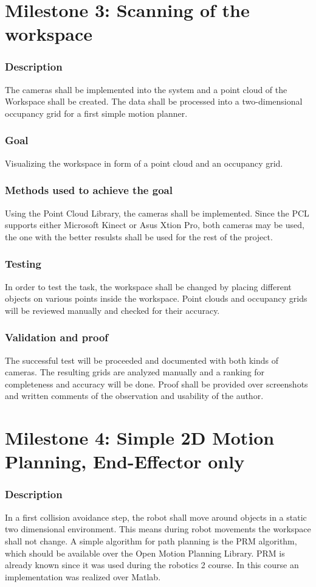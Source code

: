 \section{Milestone 3: Scanning of the workspace}
\label{chap:mile3}
\subsubsection{Description}
The cameras shall be implemented into the system and a point cloud of the Workspace shall be created. The data shall be processed into a two-dimensional occupancy grid for a first simple motion planner.
\subsubsection{Goal}
Visualizing the workspace in form of a point cloud and an occupancy grid.
\subsubsection{Methods used to achieve the goal}
Using the Point Cloud Library, the cameras shall be implemented. Since the PCL supports either Microsoft Kinect or Asus Xtion Pro, both cameras may be used, the one with the better resulsts shall be used for the rest of the project.
\subsubsection{Testing}
In order to test the task, the workspace shall be changed by placing different objects on various points inside the workspace.
Point clouds and occupancy grids will be reviewed manually and checked for their accuracy.
\subsubsection{Validation and proof}
The successful test will be proceeded and documented with both kinds of cameras.
The resulting grids are analyzed manually and a ranking for completeness and accuracy will be done.
Proof shall be provided over screenshots and written comments of the observation and usability of the author.

\section{Milestone 4: Simple 2D Motion Planning, End-Effector only}
\label{chap:mile4}
\subsubsection{Description}
In a first collision avoidance step, the robot shall move around objects in a static two dimensional environment. This means during robot movements the workspace shall not change. A simple algorithm for path planning is the PRM algorithm, which should be available over the Open Motion Planning Library. PRM is already known since it was used during the robotics 2 course. In this course an implementation was realized over Matlab.
